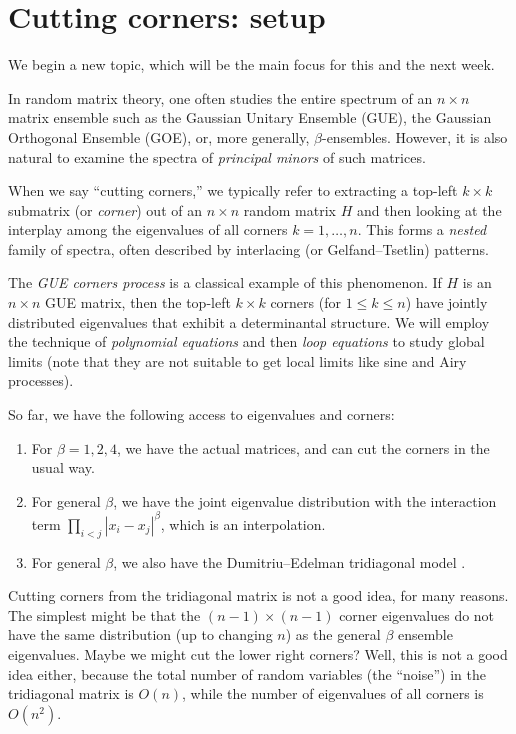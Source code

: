 \documentclass[letterpaper,11pt,oneside,reqno]{article}
\numberwithin{equation}{section}
\theoremstyle{definition}
\begin{document}
\section{Cutting corners: setup}

We begin a new topic, which will be the main focus for this and the next week.

In random matrix theory, one often studies the entire spectrum of an $n\times n$ matrix ensemble such as the Gaussian Unitary Ensemble (GUE), the Gaussian Orthogonal Ensemble (GOE), or, more generally, $\beta$-ensembles. However, it is also natural to examine the spectra of \emph{principal minors} of such matrices.

When we say ``cutting corners,'' we typically refer to extracting a top-left $k\times k$ submatrix (or \emph{corner}) out of an $n\times n$ random matrix $H$ and then looking at the interplay among the eigenvalues of all corners $k=1,\dots,n$. This forms a \emph{nested} family of spectra, often described by interlacing (or Gelfand--Tsetlin) patterns.

The \emph{GUE corners process} is a classical example of
this phenomenon. If $H$ is an $n\times n$ GUE matrix, then
the top-left $k\times k$ corners (for $1\le k\le n$) have
jointly distributed eigenvalues that exhibit a
determinantal structure. We will employ the
technique of \emph{polynomial equations} and
then \emph{loop equations} to study global limits
(note that they are not suitable to get local limits like sine and Airy processes).

So far, we have the following access to eigenvalues and corners:
\begin{enumerate}
	\item For $\beta=1,2,4$, we have the actual matrices,
		and can cut the corners in the usual way.
	\item For general $\beta$, we have the joint eigenvalue distribution
		with the interaction term $\prod_{i<j}|x_i-x_j|^\beta$, which is an interpolation.
	\item For general $\beta$, we also have the Dumitriu--Edelman
		tridiagonal model \cite{dumitriu2002matrix}.
\end{enumerate}
Cutting corners from the tridiagonal matrix is not a good idea, for many reasons.
The simplest might be that the $(n-1)\times (n-1)$ corner
eigenvalues do not have the same distribution (up to changing $n$) as the
general $\beta$ ensemble eigenvalues. Maybe we might cut the lower right corners?
Well, this is not a good idea either, because the total number of random variables
(the ``noise'') in the tridiagonal matrix is $O(n)$, while the number of eigenvalues
of all corners is $O(n^2)$.
\end{document}
